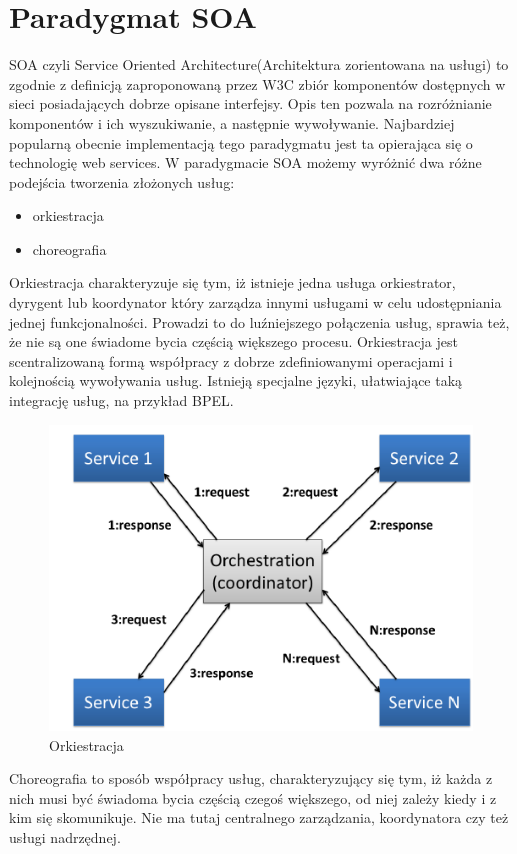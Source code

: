 \section{Paradygmat SOA}
SOA czyli Service Oriented Architecture(Architektura zorientowana na usługi) to zgodnie z definicją zaproponowaną przez W3C zbiór komponentów dostępnych w sieci posiadających dobrze opisane interfejsy. Opis ten pozwala na rozróżnianie komponentów i ich wyszukiwanie, a następnie wywoływanie. Najbardziej popularną obecnie implementacją tego paradygmatu jest ta opierająca się o technologię web services.  W paradygmacie SOA możemy wyróżnić dwa różne podejścia tworzenia złożonych usług:
 \begin{itemize}
	\item orkiestracja
	\item choreografia
\end{itemize}  
Orkiestracja charakteryzuje się tym, iż istnieje jedna usługa orkiestrator, dyrygent lub koordynator który zarządza innymi usługami w celu udostępniania jednej funkcjonalności. Prowadzi to do luźniejszego połączenia usług, sprawia też, że nie są one świadome bycia częścią większego procesu. Orkiestracja jest scentralizowaną formą współpracy z dobrze zdefiniowanymi operacjami i kolejnością wywoływania usług. Istnieją specjalne języki, ułatwiające taką integrację usług, na przykład BPEL.
\begin{figure}[!h]
	\centering
	\includegraphics[scale=0.75]{orkiestracja.png} 
	\caption{Orkiestracja}
\end{figure}
\newpage
Choreografia to sposób współpracy usług, charakteryzujący się tym,  iż każda z nich musi być świadoma bycia częścią czegoś większego, od niej zależy kiedy i z kim się skomunikuje. Nie ma tutaj centralnego zarządzania, koordynatora czy też usługi nadrzędnej. 
